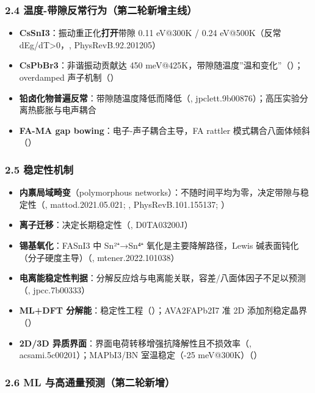 \documentclass[12pt,a4paper]{ctexart}
\providecommand{\tightlist}{%
  \setlength{\itemsep}{0pt}\setlength{\parskip}{0pt}}
\begin{document}
\subsubsection{2.4 温度-带隙反常行为（第二轮新增主线）}\label{ux6e29ux5ea6-ux5e26ux9699ux53cdux5e38ux884cux4e3aux7b2cux4e8cux8f6eux65b0ux589eux4e3bux7ebf}

\begin{itemize}
\tightlist
\item
  \textbf{CsSnI3}：振动重正化\textbf{打开}带隙 0.11 eV@300K / 0.24 eV@500K（反常 dEg/dT\textgreater0，\cite{p36}, PhysRevB.92.201205）
\item
  \textbf{CsPbBr3}：非谐振动贡献达 450 meV@425K，带隙随温度''温和变化''（\cite{p38}）；overdamped 声子机制（\cite{p37}）
\item
  \textbf{铅卤化物普遍反常}：带隙随温度降低而降低（\cite{p39}, jpclett.9b00876）；高压实验分离热膨胀与电声耦合
\item
  \textbf{FA-MA gap bowing}：电子-声子耦合主导，FA rattler 模式耦合八面体倾斜（\cite{p49}）
\end{itemize}

\subsubsection{2.5 稳定性机制}\label{ux7a33ux5b9aux6027ux673aux5236}

\begin{itemize}
\tightlist
\item
  \textbf{内禀局域畸变}（polymorphous networks）：不随时间平均为零，决定带隙与稳定性（\cite{p3}, mattod.2021.05.021; \cite{p10}, PhysRevB.101.155137; \cite{p56}）
\item
  \textbf{离子迁移}：决定长期稳定性（\cite{p12}, D0TA03200J）
\item
  \textbf{锡基氧化}：FASnI3 中 Sn²⁺→Sn⁴⁺ 氧化是主要降解路径，Lewis 碱表面钝化（分子硬度主导）（\cite{p34}, mtener.2022.101038）
\item
  \textbf{电离能稳定性判据}：分解反应焓与电离能关联，容差/八面体因子不足以预测（\cite{p50}, jpcc.7b00333）
\item
  \textbf{ML+DFT 分解能}：稳定性工程（\cite{p51}）；AVA2FAPb2I7 准 2D 添加剂稳定晶界（\cite{p55}）
\item
  \textbf{2D/3D 异质界面}：界面电荷转移增强抗降解性且不损效率（\cite{p33}, acsami.5c00201）；MAPbI3/BN 室温稳定（-25 meV@300K）（\cite{p5}）
\end{itemize}

\subsubsection{2.6 ML 与高通量预测（第二轮新增）}\label{ml-ux4e0eux9ad8ux901aux91cfux9884ux6d4bux7b2cux4e8cux8f6eux65b0ux589e}
\end{document}
